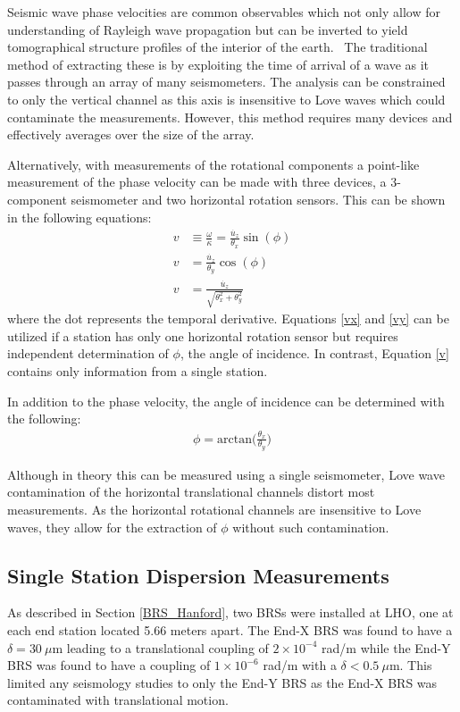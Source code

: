 \documentclass [12pt, proquest]{uwthesis}[2019]
\begin{document}
Seismic wave phase velocities are common observables which not only allow for understanding of Rayleigh wave propagation but can be inverted to yield tomographical structure profiles of the interior of the earth.~\cite{tomography} The traditional method of extracting these is by exploiting the time of arrival of a wave as it passes through an array of many seismometers. The analysis can be constrained to only the vertical channel as this axis is insensitive to Love waves which could contaminate the measurements. However, this method requires many devices and effectively averages over the size of the array.

Alternatively, with measurements of the rotational components a point-like measurement of the phase velocity can be made with three devices, a 3-component seismometer and two horizontal rotation sensors. This can be shown in the following equations:
\begin{align} 
v&\equiv\frac{\omega}{\kappa} = \frac{\dot{u_z}}{\theta_x}\sin(\phi) \label{vx} \\
v&=\frac{\dot{u_z}}{\theta_y}\cos(\phi)\label{vy} \\
v&=\frac{\dot{u_z}}{\sqrt{\theta_x^2+\theta_y^2}} \label{v}
\end{align}
where the dot represents the temporal derivative. Equations \ref{vx} and \ref{vy} can be utilized if a station has only one horizontal rotation sensor but requires independent determination of $\phi$, the angle of incidence. In contrast, Equation \ref{v} contains only information from a single station.

In addition to the phase velocity, the angle of incidence can be determined with the following:
\begin{align}
\phi=\text{arctan}\bigg(\frac{\theta_x}{\theta_y}\bigg)
\end{align}

Although in theory this can be measured using a single seismometer, Love wave contamination of the horizontal translational channels distort most measurements. As the horizontal rotational channels are insensitive to Love waves, they allow for the extraction of $\phi$ without such contamination.  

\subsection{Single Station Dispersion Measurements}
As described in Section \ref{BRS_Hanford}, two BRSs were installed at LHO, one at each end station located 5.66 meters apart. The End-X BRS was found to have a $\delta=30\ \mu \text{m}$ leading to a translational coupling of $2 \times 10^{-4}$ rad/m while the End-Y BRS was found to have a coupling of $1 \times 10^{-6}$ rad/m with a $\delta<0.5\ \mu \text{m}$. This limited any seismology studies to only the End-Y BRS as the End-X BRS was contaminated with translational motion. 
\end{document}
